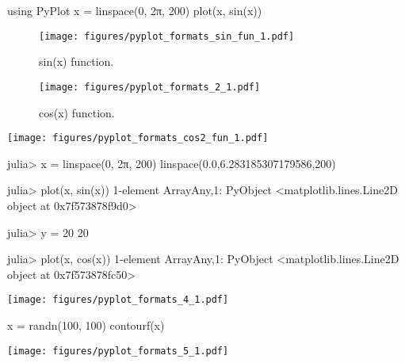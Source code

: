




\begin{juliacode}
using PyPlot
x = linspace(0, 2π, 200)
plot(x, sin(x))
\end{juliacode}
\begin{figure}[ht]
\center
\texttt{[image: figures/pyplot\_formats\_sin\_fun\_1.pdf]}
\caption{sin(x) function.}
\label{fig:sin_fun}
\end{figure}



\begin{figure}[htpb]
\center
\texttt{[image: figures/pyplot\_formats\_2\_1.pdf]}
\caption{cos(x) function.}
\end{figure}



\texttt{[image: figures/pyplot\_formats\_cos2\_fun\_1.pdf]}



\begin{juliaterm}
julia> x = linspace(0, 2π, 200)
linspace(0.0,6.283185307179586,200)

julia> plot(x, sin(x))
1-element Array{Any,1}:
 PyObject <matplotlib.lines.Line2D object at 0x7f573878f9d0>

julia> y = 20
20

julia> plot(x, cos(x))
1-element Array{Any,1}:
 PyObject <matplotlib.lines.Line2D object at 0x7f573878fc50>

\end{juliaterm}
\texttt{[image: figures/pyplot\_formats\_4\_1.pdf]}



\begin{juliacode}
x = randn(100, 100)
contourf(x)
\end{juliacode}
\texttt{[image: figures/pyplot\_formats\_5\_1.pdf]}
